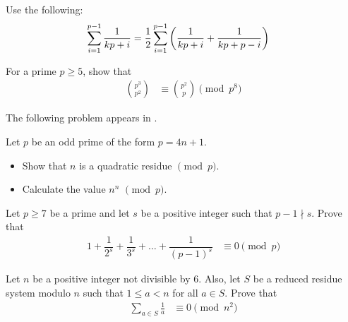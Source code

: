 	\begin{hint}
		Use the following:
			\begin{align*}
				\sum_{i=1}^{p-1}\dfrac{1}{kp+i}
					& = \dfrac{1}{2}\sum_{i=1}^{p-1}\left(\dfrac{1}{kp+i}+\dfrac{1}{kp+p-i}\right)
			\end{align*}
	\end{hint}

	\begin{problem}
		For a prime $p \geq 5$, show that
			\begin{align*}
				\binom{p^3}{p^2}
					& \equiv \binom{p^2}{p} \pmod{p^8}
			\end{align*}
	\end{problem}
The following problem appears in \textcite[D23]{vandendriessche_lee_2007}.
	\begin{problem}
		Let $p$ be an odd prime of the form $p=4n+1$.
		\begin{itemize}
			\item Show that $n$ is a quadratic residue $\pmod{p}$.
			\item Calculate the value $n^{n}$  $\pmod{p}$.
		\end{itemize}
	\end{problem}

	\begin{problem} %
		Let $p \geq 7$ be a prime and let $s$ be a positive integer such that $p-1 \nmid s$. Prove that
		\begin{align*}
			1 + \dfrac {1}{2^s} + \dfrac {1}{3^s} + \ldots + \dfrac {1}{(p - 1)^s}
				& \equiv 0 \pmod p
		\end{align*}
	\end{problem}

	\begin{problem} %
		Let $n$ be a positive integer not divisible by $6$. Also, let $S$ be a reduced residue system modulo $n$ such that $1 \leq a <n$ for all $a \in S$. Prove that
			\begin{align*}
				\sum_{a \in S} \frac{1}{a}
					& \equiv 0 \pmod{n^2}
			\end{align*}
	\end{problem}
